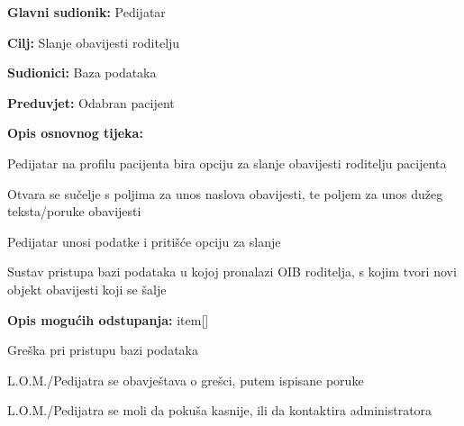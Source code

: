 					\noindent {}
					\begin{packed_item}
						
						\item \textbf{Glavni sudionik: }Pedijatar
						\item  \textbf{Cilj:} Slanje obavijesti roditelju
						\item  \textbf{Sudionici:} Baza podataka
						\item  \textbf{Preduvjet:} Odabran pacijent
						\item  \textbf{Opis osnovnog tijeka:}
						
						\item[] \begin{packed_enum}
							
							\item Pedijatar na profilu pacijenta bira opciju za slanje obavijesti roditelju pacijenta
							\item Otvara se sučelje s poljima za unos naslova obavijesti, te poljem za unos dužeg teksta/poruke obavijesti
							\item Pedijatar unosi podatke i pritišće opciju za slanje
							\item Sustav pristupa bazi podataka u kojoj pronalazi OIB roditelja, s kojim tvori novi objekt obavijesti koji se šalje
						\end{packed_enum}
						\item \textbf{Opis mogućih odstupanja:}
						item[] \begin{packed_item}
							\item[4.a] Greška pri pristupu bazi podataka
							\item[] \begin{packed_enum}
								
								\item L.O.M./Pedijatra se obavještava o grešci, putem ispisane poruke
								\item L.O.M./Pedijatra se moli da pokuša kasnije, ili da kontaktira administratora
								
							\end{packed_enum}
						\end{packed_item}
					\end{packed_item}
					
